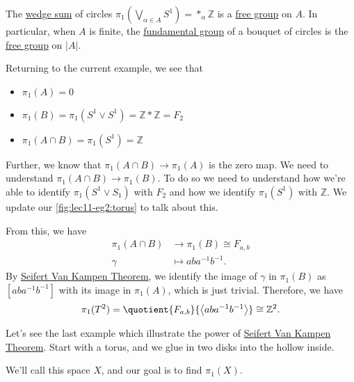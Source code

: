 \begin{explanation}
	\begin{corollary}
		The \hyperref[CW-complex-wedge-sum]{wedge sum} of circles \(\pi _1(\bigvee_{\alpha \in A}S^1) = \ast_\alpha \mathbb{Z} \) is a \hyperref[def:free-group]{free group} on \(A\).
		In particular, when \(A\) is finite, the \hyperref[def:fundamental-group]{fundamental group} of a bouquet of circles is the \hyperref[def:free-group]{free group}
		on \(\left\vert A \right\vert \).
	\end{corollary}

	Returning to the current example, we see that
	\begin{itemize}
		\item \(\pi _1(A) = 0\)
		\item \(\pi _1(B) = \pi _1(S^1\vee S^1) = \mathbb{Z} \ast \mathbb{Z}  = F_2\)
		\item \(\pi _1(A\cap B) = \pi _1(S^1) = \mathbb{Z} \)
	\end{itemize}

	Further, we know that \(\pi _1(A\cap B)\to \pi _1(A)\) is the zero map. We need to understand \(\pi_1(A\cap B)\to \pi _1(B)\). To do so we
	need to understand how we're able to identify \(\pi _1(S^1\vee S_1)\) with \(F_2\) and how we identify \(\pi _1(S^1)\) with \(\mathbb{Z} \).
	We update our \autoref{fig:lec11-eg2:torus} to talk about this.
	\begin{figure}[H]
		\centering
		\label{fig:lec11-eg2:torus-ver2}
	\end{figure}
	From this, we have
	\[
		\begin{split}
			\pi _1(A\cap B) &\to \pi _1(B)\cong F_{a, b}\\
			\gamma &\mapsto aba^{-1} b^{-1}.
		\end{split}
	\]
	By \hyperref[thm:Seifert-Van-Kampen-Theorem]{Seifert Van Kampen Theorem}, we identify the image of \(\gamma \) in \(\pi _1(B)\) as \([aba^{-1} b^{-1} ]\) with
	its image in \(\pi _1(A)\), which is just trivial. Therefore, we have
	\[
		\pi _1(T^2) = \quotient{F_{a, b}}{\left< aba^{-1} b^{-1}  \right> } \cong \mathbb{Z} ^2.
	\]
\end{explanation}
\begin{eg}
	Let's see the last example which illustrate the power of \hyperref[thm:Seifert-Van-Kampen-Theorem]{Seifert Van Kampen Theorem}. Start with a torus, and
	we glue in two disks into the hollow inside.
	\begin{figure}[H]
		\centering
		\label{fig:lec11:eg-3:1}
	\end{figure}
	We'll call this space \(X\), and our goal is to find \(\pi_1(X)\).
\end{eg}
